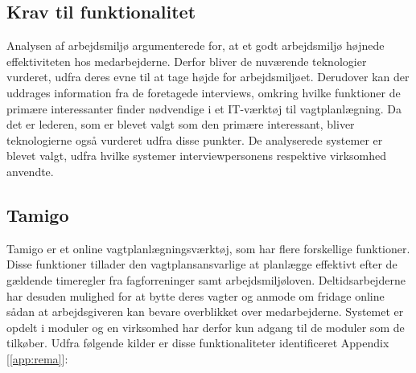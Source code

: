 \subsection{Krav til funktionalitet}
Analysen af arbejdsmiljø argumenterede for, at et godt arbejdsmiljø højnede effektiviteten hos medarbejderne. Derfor bliver de nuværende teknologier vurderet, udfra deres evne til at tage højde for arbejdsmiljøet. Derudover kan der uddrages information fra de foretagede interviews, omkring hvilke funktioner de primære interessanter finder nødvendige i et IT-værktøj til vagtplanlægning. Da det er lederen, som er blevet valgt som den primære interessant, bliver teknologierne også vurderet udfra disse punkter. De analyserede systemer er blevet valgt, udfra hvilke systemer interviewpersonens respektive virksomhed anvendte. 

\subsection{Tamigo}
Tamigo er et online vagtplanlægningsværktøj, som har flere forskellige funktioner. Disse funktioner tillader den vagtplansansvarlige at planlægge effektivt efter de gældende timeregler fra fagforreninger samt arbejdsmiljøloven. Deltidsarbejderne har desuden mulighed for at bytte deres vagter og anmode om fridage online sådan at arbejdsgiveren kan bevare overblikket over medarbejderne. Systemet er opdelt i moduler og en virksomhed har derfor kun adgang til de moduler som de tilkøber. Udfra følgende kilder er disse funktionaliteter identificeret \citep{Tamigo, Trustpilot} Appendix [\ref{app:rema}]:

